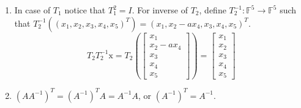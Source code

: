 \documentclass{article}
\newcommand{\F}{\mathbb{F}}
\begin{document}
\begin{enumerate}[label=\textbf{6.\arabic*.}]
    \item In case of $T_1$ notice that $T_1^2 = I$. For inverse of $T_2$,
    define $T_2^{-1}:\F^5\to\F^5$ such that $T_2^{-1}((x_1, x_2, x_3, x_4, x_5)^T) =
    (x_1, x_2 - ax_4, x_3, x_4, x_5)^T$.
    $$T_2T_2^{-1}\mathrm{x} = T_2
    \left(\left[\begin{matrix}x_1\\x_2-ax_4\\x_3\\x_4\\x_5\end{matrix}\right]\right)
    = \left[\begin{matrix}x_1\\x_2\\x_3\\x_4\\x_5\end{matrix}\right]$$

    \addtocounter{enumi}{2}

    \item $(AA^{-1})^T = (A^{-1})^TA = A^{-1}A$, or $(A^{-1})^T = A^{-1}$.
\end{enumerate}
\end{document}
